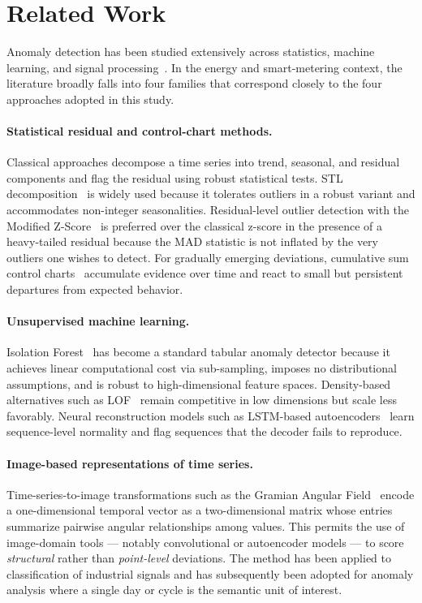 \documentclass{article}
\begin{document}
\section{Related Work}\label{sec:related}
Anomaly detection has been studied extensively across statistics, machine learning, and signal processing~\cite{chandola2009anomaly,hodge2004survey,aggarwal2017outlier,hawkins1980identification}. In the energy and smart-metering context, the literature broadly falls into four families that correspond closely to the four approaches adopted in this study.

\paragraph{Statistical residual and control-chart methods.}
Classical approaches decompose a time series into trend, seasonal, and residual components and flag the residual using robust statistical tests. STL decomposition~\cite{cleveland1990stl} is widely used because it tolerates outliers in a robust variant and accommodates non-integer seasonalities. Residual-level outlier detection with the Modified Z-Score~\cite{iglewicz1993outliers} is preferred over the classical z-score in the presence of a heavy-tailed residual because the MAD statistic is not inflated by the very outliers one wishes to detect. For gradually emerging deviations, cumulative sum control charts~\cite{page1954cusum} accumulate evidence over time and react to small but persistent departures from expected behavior.

\paragraph{Unsupervised machine learning.}
Isolation Forest~\cite{liu2008isolation,liu2012isolation} has become a standard tabular anomaly detector because it achieves linear computational cost via sub-sampling, imposes no distributional assumptions, and is robust to high-dimensional feature spaces. Density-based alternatives such as LOF~\cite{breunig2000lof} remain competitive in low dimensions but scale less favorably. Neural reconstruction models such as LSTM-based autoencoders~\cite{malhotra2016lstm} learn sequence-level normality and flag sequences that the decoder fails to reproduce.

\paragraph{Image-based representations of time series.}
Time-series-to-image transformations such as the Gramian Angular Field~\cite{wang2015gaf,wang2015imaging} encode a one-dimensional temporal vector as a two-dimensional matrix whose entries summarize pairwise angular relationships among values. This permits the use of image-domain tools --- notably convolutional or autoencoder models --- to score \emph{structural} rather than \emph{point-level} deviations. The method has been applied to classification of industrial signals and has subsequently been adopted for anomaly analysis where a single day or cycle is the semantic unit of interest.
\end{document}
